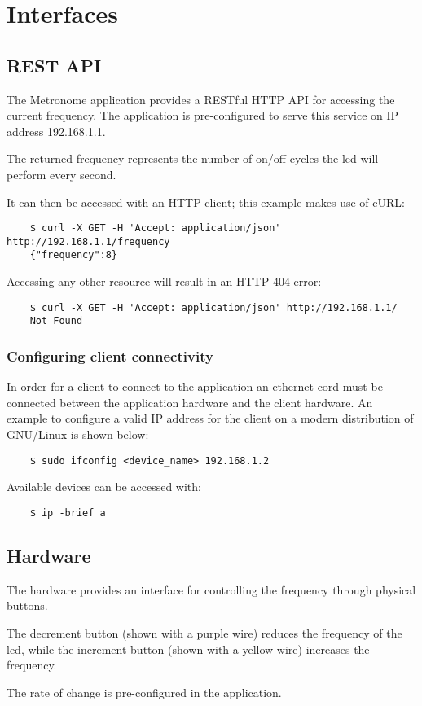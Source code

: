 \chapter{Interfaces}

\section{REST API}

The Metronome application provides a RESTful HTTP API for accessing the current frequency. The application is pre-configured to serve this service on IP address 192.168.1.1.

The returned frequency represents the number of on/off cycles the led will perform every second.

It can then be accessed with an HTTP client; this example makes use of cURL:

\begin{verbatim}
    $ curl -X GET -H 'Accept: application/json' http://192.168.1.1/frequency
    {"frequency":8}
\end{verbatim}

Accessing any other resource will result in an HTTP 404 error:

\begin{verbatim}
    $ curl -X GET -H 'Accept: application/json' http://192.168.1.1/
    Not Found
\end{verbatim}


\subsection{Configuring client connectivity}

In order for a client to connect to the application an ethernet cord must be connected between the application hardware and the client hardware. An example to configure a valid IP address for the client on a modern distribution of GNU/Linux is shown below:

\begin{verbatim}
    $ sudo ifconfig <device_name> 192.168.1.2
\end{verbatim}

Available devices can be accessed with:

\begin{verbatim}
    $ ip -brief a
\end{verbatim}

\section{Hardware}

The hardware provides an interface for controlling the frequency through physical buttons.

The decrement button (shown with a purple wire) reduces the frequency of the led, while the increment button (shown with a yellow wire) increases the frequency.

The rate of change is pre-configured in the application.
